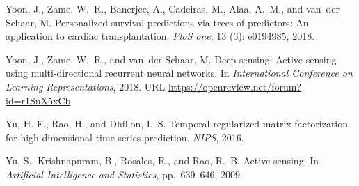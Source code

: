 \documentclass{article}
\begin{document}
\begin{thebibliography}{29}
	Yoon, J., Zame, W.~R., Banerjee, A., Cadeiras, M., Alaa, A.~M., and van~der
	Schaar, M.
	\newblock Personalized survival predictions via trees of predictors: An
	application to cardiac transplantation.
	\newblock \emph{PloS one}, 13 (3): e0194985,
	2018{}.
	
	Yoon, J., Zame, W.~R., and van~der Schaar, M.
	\newblock Deep sensing: Active sensing using multi-directional recurrent neural
	networks.
	\newblock In \emph{International Conference on Learning Representations},
	2018{}.
	\newblock URL \url{https://openreview.net/forum?id=r1SnX5xCb}.
	
	Yu, H.-F., Rao, H., and Dhillon, I.~S.
	\newblock Temporal regularized matrix factorization for high-dimensional time
	series prediction.
	\newblock \emph{NIPS}, 2016.
	
	Yu, S., Krishnapuram, B., Rosales, R., and Rao, R.~B.
	\newblock Active sensing.
	\newblock In \emph{Artificial Intelligence and Statistics}, pp.\  639--646,
	2009.
	
\end{thebibliography}
\end{document}

